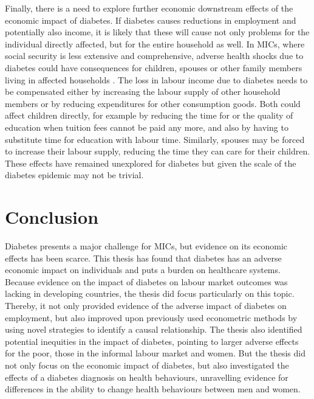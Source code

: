 Finally, there is a need to explore further economic downstream effects of the economic impact of diabetes. If diabetes causes reductions in employment and potentially also income, it is likely that these will cause not only problems for the individual directly affected, but for the entire household as well. In \acp{MIC}, where social security is less extensive and comprehensive, adverse health shocks due to diabetes could have consequences for children, spouses or other family members living in affected households \parencite{Alam2014}. The loss in labour income due to diabetes needs to be compensated either by increasing the labour supply of other household members or by reducing expenditures for other consumption goods. Both could affect children directly, for example by reducing the time for or the quality of education when tuition fees cannot be paid any more, and also by having to substitute time for education with labour time. Similarly, spouses may be forced to increase their labour supply, reducing the time they can care for their children. These effects have remained unexplored for diabetes but given the scale of the diabetes epidemic may not be trivial.



\section{Conclusion}

Diabetes presents a major challenge for \acp{MIC}, but evidence on its economic effects has been scarce. This thesis has found that diabetes has an adverse economic impact on individuals and puts a burden on healthcare systems. Because evidence on the impact of diabetes on labour market outcomes was lacking in developing countries, the thesis did focus particularly on this topic. Thereby, it not only provided evidence of the adverse impact of diabetes on employment, but also improved upon previously used econometric methods by using novel strategies to identify a causal relationship. The thesis also identified potential inequities in the impact of diabetes, pointing to larger adverse effects for the poor, those in the informal labour market and women. But the thesis did not only focus on the economic impact of diabetes, but also investigated the effects of a diabetes diagnosis on health behaviours, unravelling evidence for differences in the ability to change health behaviours between men and women.

